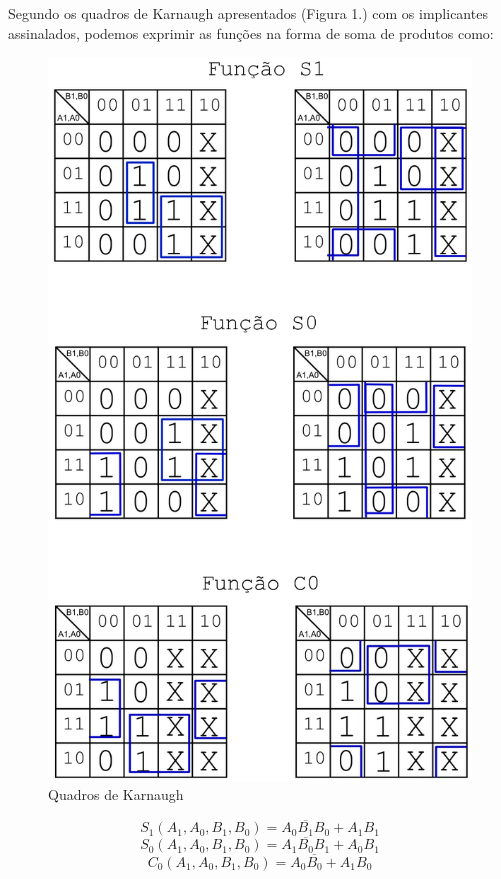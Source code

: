 \documentclass[a4paper,12pt]{article}
\begin{document}
Segundo os quadros de Karnaugh apresentados (Figura 1.) com os implicantes assinalados, podemos exprimir as funções na forma de soma de produtos como:
\begin{figure}[h]
\caption{Quadros de Karnaugh}
\begin{center}
\includegraphics[scale=.25]{k3x.png}
\end{center}
\end{figure}

\begin{equation}
S_1(A_1,A_0,B_1,B_0) = A_0\overline{B_1}B_0 + A_1B_1
\end{equation}
\begin{equation}
S_0(A_1,A_0,B_1,B_0) = A_1\overline{B_0}B_1 + A_0B_1
\end{equation}
\begin{equation}
C_0(A_1,A_0,B_1,B_0) = A_0\overline{B_0} + A_1B_0
\end{equation}
\end{document}
